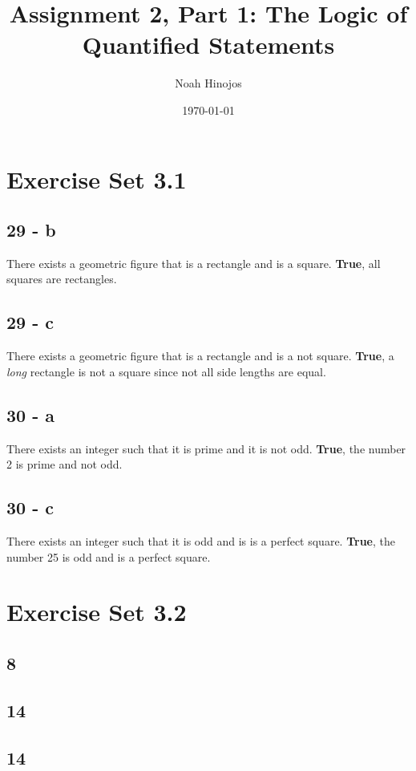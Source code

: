 \documentclass[12pt]{article}
\title{\textbf{Assignment 2, Part 1: The Logic of Quantified Statements}}
\author{Noah Hinojos}
\date{\today}
\begin{document}
\maketitle

\section*{Exercise Set 3.1}

\subsection*{29 - b}
There exists a geometric figure that is a rectangle and is a square. 
\textbf{True}, all squares are rectangles.

\subsection*{29 - c}
There exists a geometric figure that is a rectangle and is a not square.
\textbf{True}, a \textit{long} rectangle is not a square since not all side lengths are equal.

\subsection*{30 - a}
There exists an integer such that it is prime and it is not odd.
\textbf{True}, the number 2 is prime and not odd.

\subsection*{30 - c}
There exists an integer such that it is odd and is is a perfect square.
\textbf{True}, the number 25 is odd and is a perfect square.

\section*{Exercise Set 3.2}

\subsection*{8}

\subsection*{14}

\subsection*{14}
\end{document}
